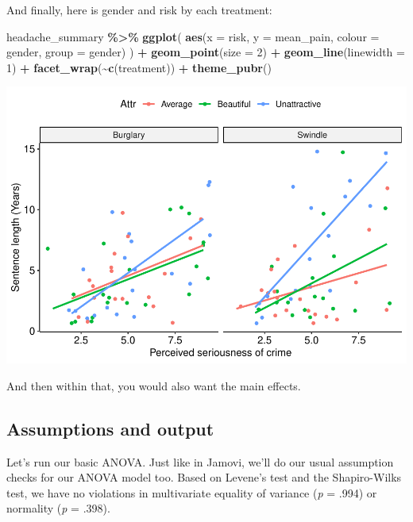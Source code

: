 \documentclass[
]{book}
\newenvironment{Shaded}{\begin{snugshade}}{\end{snugshade}}
\newcommand{\AttributeTok}[1]{\textcolor[rgb]{0.13,0.29,0.53}{#1}}
\newcommand{\DecValTok}[1]{\textcolor[rgb]{0.00,0.00,0.81}{#1}}
\newcommand{\FunctionTok}[1]{\textcolor[rgb]{0.13,0.29,0.53}{\textbf{#1}}}
\newcommand{\NormalTok}[1]{#1}
\newcommand{\SpecialCharTok}[1]{\textcolor[rgb]{0.81,0.36,0.00}{\textbf{#1}}}
\begin{document}
And finally, here is gender and risk by each treatment:

\begin{Shaded}
\begin{Highlighting}[]
\NormalTok{headache\_summary }\SpecialCharTok{\%\textgreater{}\%}
  \FunctionTok{ggplot}\NormalTok{(}
    \FunctionTok{aes}\NormalTok{(}\AttributeTok{x =}\NormalTok{ risk, }\AttributeTok{y =}\NormalTok{ mean\_pain, }\AttributeTok{colour =}\NormalTok{ gender, }\AttributeTok{group =}\NormalTok{ gender)}
\NormalTok{  ) }\SpecialCharTok{+}
  \FunctionTok{geom\_point}\NormalTok{(}\AttributeTok{size =} \DecValTok{2}\NormalTok{) }\SpecialCharTok{+}
  \FunctionTok{geom\_line}\NormalTok{(}\AttributeTok{linewidth =} \DecValTok{1}\NormalTok{) }\SpecialCharTok{+}
  \FunctionTok{facet\_wrap}\NormalTok{(}\SpecialCharTok{\textasciitilde{}}\FunctionTok{c}\NormalTok{(treatment)) }\SpecialCharTok{+}
  \FunctionTok{theme\_pubr}\NormalTok{()}
\end{Highlighting}
\end{Shaded}

\includegraphics{_main_files/figure-latex/unnamed-chunk-269-1.pdf}

And then within that, you would also want the main effects.

\subsection{Assumptions and output}\label{assumptions-and-output}

Let's run our basic ANOVA. Just like in Jamovi, we'll do our usual assumption checks for our ANOVA model too. Based on Levene's test and the Shapiro-Wilks test, we have no violations in multivariate equality of variance (\emph{p} = .994) or normality (\emph{p} = .398).
\end{document}
